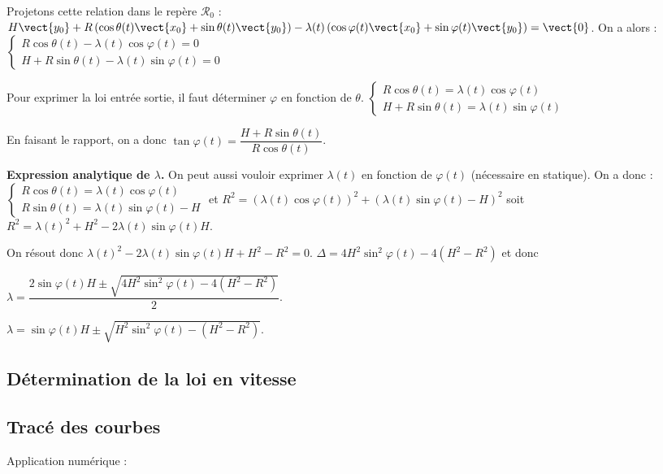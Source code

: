 Projetons cette relation dans le repère $\mathcal{R}_{0}$ :
$H\vect{y_0}+R\left(\cos\theta(t) \vect{x_0}+\sin\theta(t) \vect{y_0}\right) 
-\lambda(t)\left(\cos\varphi(t) \vect{x_0}+\sin\varphi(t) \vect{y_0}\right) 
=\vect{0}$. On a alors :
$\left\{
\begin{array}{l}
R\cos\theta(t) -\lambda(t) \cos\varphi(t) =0 \\
H+R\sin\theta(t) -\lambda(t)\sin\varphi(t) =0
\end{array} 
\right.$


Pour exprimer la loi entrée sortie, il faut déterminer $\varphi$ en fonction de $\theta$.
$\left\{
\begin{array}{l}
R\cos\theta(t) = \lambda(t) \cos\varphi(t)\\
H+R\sin\theta(t) =\lambda(t)\sin\varphi(t)
\end{array} 
\right.$

En faisant le rapport, on a donc $\tan\varphi(t)=\dfrac{H+R\sin\theta(t)}{R\cos\theta(t)}$.



\textbf{Expression analytique de $\lambda$.}
On peut aussi vouloir exprimer $\lambda(t)$ en fonction de $\varphi(t)$ (nécessaire en statique). On a donc :
$\left\{
\begin{array}{l}
R\cos\theta(t) = \lambda(t) \cos\varphi(t)\\
R\sin\theta(t) =\lambda(t)\sin\varphi(t) - H
\end{array} 
\right.$
et $R^2  = \left( \lambda(t) \cos\varphi(t) \right)^2 + \left(\lambda(t)\sin\varphi(t) - H\right)^2$ soit
$R^2  =  \lambda(t)^2+H^2 -2\lambda(t)\sin\varphi(t)  H $.

On résout donc  $ \lambda(t)^2 -2\lambda(t)\sin\varphi(t)  H +H^2 - R^2 = 0$.
$\Delta =  4H^2\sin^2\varphi(t)  -4\left(H^2 - R^2 \right)$ 
 et donc
 
 $\lambda = \dfrac{2\sin\varphi(t) H \pm \sqrt{4H^2\sin^2\varphi(t)  -4\left(H^2 - R^2\right)}}{2}$.
 
 $\lambda = \sin\varphi(t) H \pm \sqrt{H^2\sin^2\varphi(t)  -\left(H^2 - R^2\right)}$.


\subsection{Détermination de la loi en vitesse}



\subsection{Tracé des courbes} 
Application numérique : 

